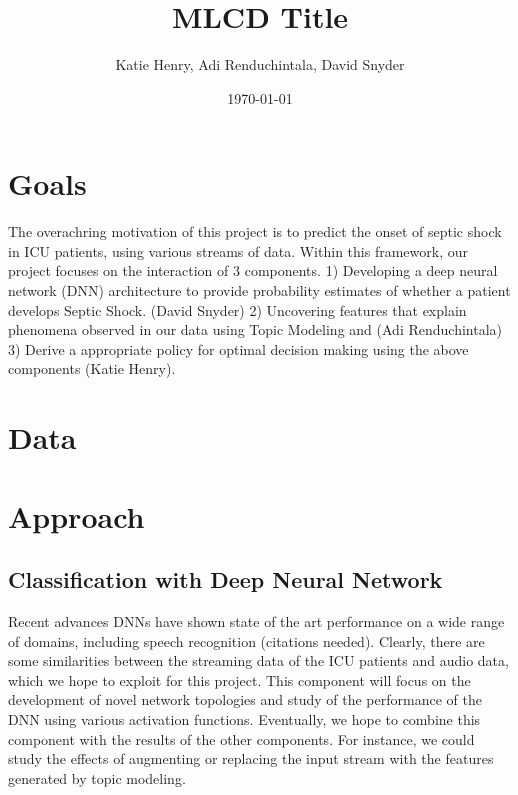 \documentclass[dvips,12pt]{article}
\begin{document}

\title{MLCD Title}
\author{Katie Henry, Adi Renduchintala, David Snyder}
\date{\today}



\maketitle


\section{Goals}
The overachring  motivation of this project is to predict the onset of septic shock in ICU patients, using various streams of data. 
Within this framework, our project focuses on the interaction of 3 components.
1) Developing a deep neural network (DNN) architecture to provide probability estimates of whether a patient develops Septic Shock. (David Snyder)
2) Uncovering features that explain phenomena observed in our data  using Topic Modeling and  (Adi Renduchintala)
3) Derive a appropriate policy for optimal decision making using the above  components (Katie Henry).


\section{Data}

\section{Approach}

\subsection{Classification with Deep Neural Network}

Recent advances DNNs have shown state of the art performance on a wide range of domains, including speech recognition (citations needed). Clearly, there are some similarities between
the streaming data of the ICU patients and audio data, which we hope to exploit for this project. This component will focus on the development of
novel network topologies and study of the performance of the DNN using various activation functions. Eventually, we hope to combine this component with the results of the other components. 
For instance, we could study the effects of augmenting or replacing the input stream with the features generated by topic modeling.
\end{document}

